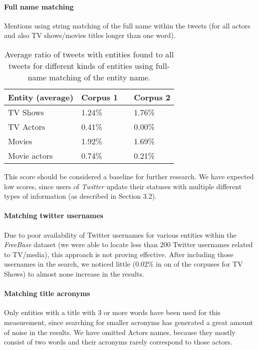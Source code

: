 \paragraph{Full name matching}
Mentions using string matching of the full name within the tweets (for all actors and also TV shows/movies titles longer
than one word).

\begin{center}
  \begin{table}[h!b!p!]
    \begin{tabular}{ | p{4cm} | p{2cm} | p{1cm}| p{2cm} | } \hline
      Entity (average) & Corpus 1 & & Corpus 2 \\ \hline
      TV Shows & 1.24\% & & 1.76\% \\ \hline
      TV Actors & 0.41\% & & 0.00\% \\ \hline
      Movies & 1.92\% & & 1.69\% \\ \hline
      Movie actors & 0.74\% & & 0.21\% \\ \hline
    \end{tabular}
    \caption{Average ratio of tweets with entities found to all tweets for different kinds of entities using full-name matching of the entity name.}
  \end{table}
\end{center}

This score should be considered a baseline for further research. We have expected low scores, since users of \textit{Twitter} update their statuses with multiple different types of information (as described in Section 3.2).

\paragraph{Matching twitter usernames}
Due to poor availability of Twitter usernames for various entities within the \textit{FreeBase} dataset (we were able to locate less than 200 Twitter
usernames related to TV/media), this approach is not proving effective. After including those usernames in the search,
we noticed little (0.02\% in on of the corpuses for TV Shows) to almost none increase in the results.

\paragraph{Matching title acronyms}
Only entities with a title with 3 or more words have been used for this measurement, since searching
for smaller acronyms has generated a great amount of noise in the results. We have omitted Actors names, because
they mostly consist of two words and their acronyms rarely correspond to those actors.

